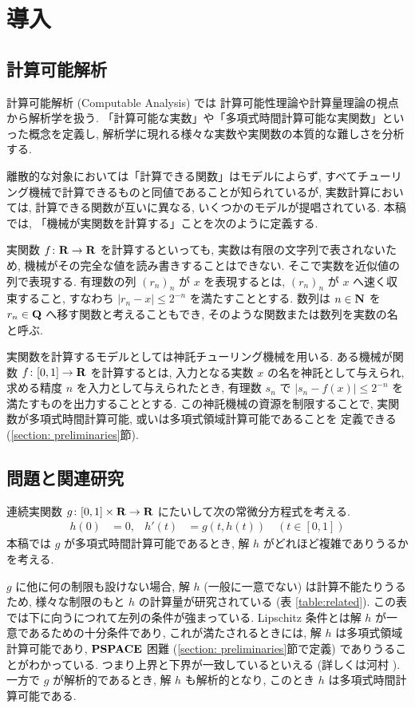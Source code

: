 \section{導入}

\subsection{計算可能解析}

計算可能解析 (Computable Analysis) \cite{weihrauch00:_comput_analy} では
計算可能性理論や計算量理論の視点から解析学を扱う. 
「計算可能な実数」や「多項式時間計算可能な実関数」といった概念を定義し, 
解析学に現れる様々な実数や実関数の本質的な難しさを分析する. 

離散的な対象においては「計算できる関数」はモデルによらず,
すべてチューリング機械で計算できるものと同値であることが知られているが,
実数計算においては, 計算できる関数が互いに異なる, いくつかのモデルが提唱されている.
本稿では,
「機械が実関数を計算する」ことを次のように定義する.

実関数 $f \colon \mathbf R \to \mathbf R$ を計算するといっても,
実数は有限の文字列で表されないため,
機械がその完全な値を読み書きすることはできない.
そこで実数を近似値の列で表現する.
有理数の列 $(r_n)_n$ が $x$ を表現するとは,
$(r_n)_n$ が $x$ へ速く収束すること, 
すなわち $|r_n - x| \le 2^{-n}$ を満たすこととする.
数列は $n \in \mathbf N$ を $r_n \in \mathbf Q$ へ移す関数と考えることもでき,
そのような関数または数列を実数の名と呼ぶ.

実関数を計算するモデルとしては神託チューリング機械を用いる. 
ある機械が関数 $f \colon [0, 1] \to \mathbf R$ を計算するとは,
入力となる実数 $x$ の名を神託として与えられ,
求める精度 $n$ を入力として与えられたとき,
有理数 $s_n$ で $|s_n - f(x)| \le 2^{-n}$ を満たすものを出力することとする.
この神託機械の資源を制限することで, 
実関数が多項式時間計算可能, 或いは多項式領域計算可能であることを
定義できる (\ref{section: preliminaries}節).

\subsection{問題と関連研究}

連続実関数 $g \colon [0,1] \times \mathbf R \to \mathbf R$ にたいして次の常微分方程式を考える. 
\begin{align}
 \label{eq:ode}
 h(0) & = 0, &
 h'(t) & = g(t,h(t)) \quad (t \in [0,1])
\end{align}
本稿では $g$ が多項式時間計算可能であるとき, 
解 $h$ がどれほど複雑でありうるかを考える.

$g$ に他に何の制限も設けない場合, 解 $h$ (一般に一意でない) は計算不能たりうるため,
様々な制限のもと $h$ の計算量が研究されている (表 \ref{table:related}).
この表では下に向うにつれて左列の条件が強まっている. 
Lipschitz 条件とは解 $h$ が一意であるための十分条件であり, 
これが満たされるときには, 解 $h$ は多項式領域計算可能であり, 
${\bf PSPACE}$ 困難 (\ref{section: preliminaries}節で定義) でありうることがわかっている. 
つまり上界と下界が一致しているといえる (詳しくは河村 \cite{kawamura2010lipschitz}).
一方で $g$ が解析的であるとき, 解 $h$ も解析的となり, 
このとき $h$ は多項式時間計算可能である.

